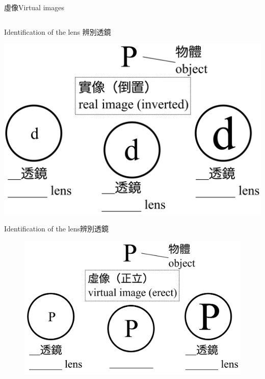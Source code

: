 \documentclass[beamer=true]{standalone}
\begin{document}
\begin{frame}{虛像Virtual images}
\begin{columns}
    \end{columns}
\end{frame}

\begin{frame}
    {Identification of the lens 辨別透鏡}
    \par{\par\centering\includegraphics[width=\textwidth]{../../assets/1133445.png}\par}
\end{frame}
\begin{frame}
    {Identification of the lens辨別透鏡}
    \begin{figure}
        \centering
        \includegraphics[width=1\linewidth]{../../assets/dedn2189u328n2.png}
    \end{figure}
\end{frame}
\end{document}
